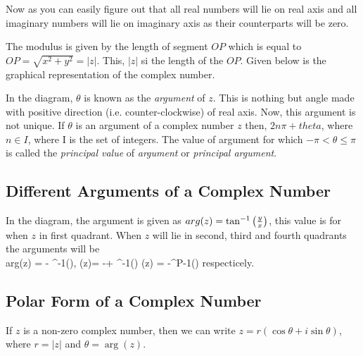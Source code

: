 Now as you can easily figure out that all real numbers will lie on real axis and all imaginary numbers will lie on imaginary axis
as their counterparts will be zero.

The modulus is given by the length of segment $OP$ which is equal to $OP=\sqrt{x^2+y^2}=|z|$. This, $|z|$ si the length of the
$OP$. Given below is the graphical representation of the complex number.


In the diagram, $\theta$ is known as the {\it argument} of $z$. This is nothing but angle made with positive direction
(i.e. counter-clockwise) of real axis. Now, this argument is not unique. If $\theta$ is an argument of a complex number $z$ then,
$2n\pi + theta$, where $n\in I$, where I is the set of integers. The value of argument for which $-\pi<\theta\leq \pi$ is called
the {\it principal value} of {\it argument} or {\it principal argument}.

\subsection{Different Arguments of a Complex Number}
In the diagram, the argument is given as $\\arg(z) = \tan^{-1}\left(\frac{y}{x}\right)$, this value is for when $z$ in first
quadrant. When $z$ will lie in second, third and fourth quadrants the arguments will be
\startformula \\arg(z) = \pi - \tan^{-1}\left(\right), \arg(z)= -\pi + \tan^{-1}\left(\right) \arg(z) =
-\tan^P{-1}\left(\right)\stopformula
respecticely.

\subsection{Polar Form of a Complex Number}
If $z$ is a non-zero complex number, then we can write $z = r(\cos\theta + i\sin\theta)$, where $r = |z|$ and $\theta = \arg(z)$.

